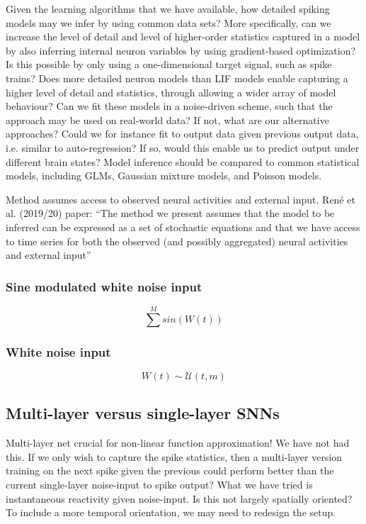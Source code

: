 \documentclass[mphil,deptreport,ianc]{infthesis} %
\begin{document}
Given the learning algorithms that we have available, how detailed spiking models may we infer by using common data sets? More specifically, can we increase the level of detail and level of higher-order statistics captured in a model by also inferring internal neuron variables by using gradient-based optimization? Is this possible by only using a one-dimensional target signal, such as spike trains? Does more detailed neuron models than LIF models enable capturing a higher level of detail and statistics, through allowing a wider array of model behaviour? Can we fit these models in a noise-driven scheme, such that the approach may be used on real-world data? If not, what are our alternative approaches? Could we for instance fit to output data given previous output data, i.e. similar to auto-regression? If so, would this enable us to predict output under different brain states?
Model inference should be compared to common statistical models, including GLMs, Gaussian mixture models, and Poisson models.


Method assumes access to observed neural activities and external input.
René et al. (2019/20) paper:
“The method we present assumes that the model to be inferred can be expressed as a
set of stochastic equations and that we have access to time series for both the observed (and possibly aggregated) neural activities and external input”


\subsubsection{Sine modulated white noise input}

\begin{equation}
    \sum^M sin(W(t))
\end{equation}

\subsubsection{White noise input}

\begin{equation}
    W(t) \sim \mathcal{U}(t, m)
\end{equation}

\subsection{Multi-layer versus single-layer SNNs}

Multi-layer net crucial for non-linear function approximation! We have not had this. If we only wish to capture the spike statistics, then a multi-layer version training on the next spike given the previous could perform better than the current single-layer noise-input to spike output?
What we have tried is instantaneous reactivity given noise-input. Is this not largely spatially oriented? To include a more temporal orientation, we may need to redesign the setup.
\end{document}
